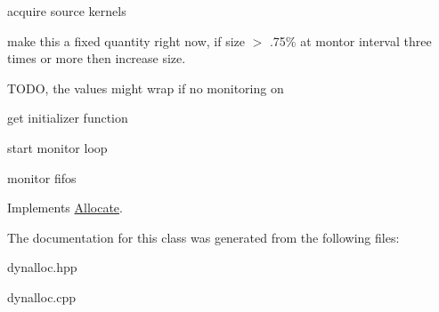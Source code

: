 acquire source kernels

make this a fixed quantity right now, if size $>$ .75\% at montor interval three times or more then increase size.

T\+O\+D\+O, the values might wrap if no monitoring on

get initializer function

start monitor loop

monitor fifo\textquotesingle{}s 

Implements \hyperlink{class_allocate_a44f9b51c382fec159233609e21b9d272}{Allocate}.



The documentation for this class was generated from the following files\+:\begin{DoxyCompactItemize}
\item 
dynalloc.\+hpp\item 
dynalloc.\+cpp\end{DoxyCompactItemize}
